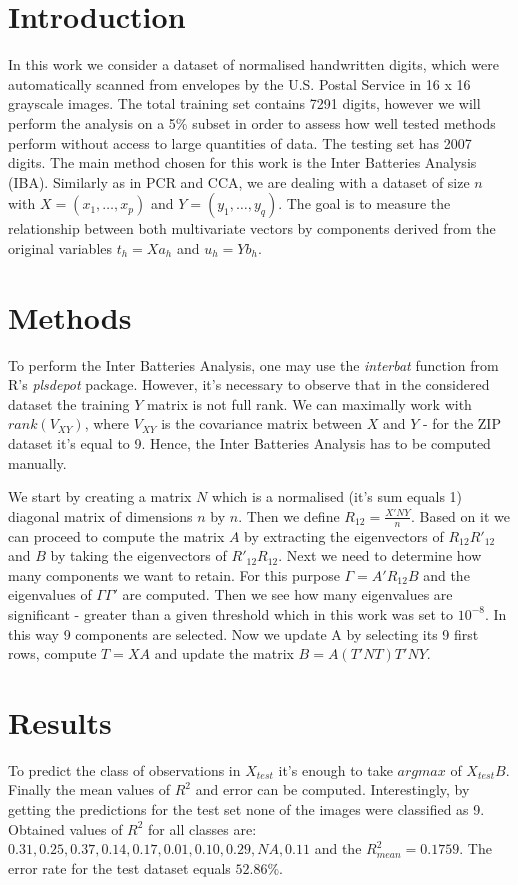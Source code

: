 \documentclass[a4,12pt]{article}
\begin{document}
    \section{Introduction}

    In this work we consider a dataset of normalised handwritten digits, which were automatically scanned from envelopes by the U.S. Postal Service in 16 x 16 grayscale images.
    The total training set contains 7291 digits, however we will perform the analysis on a 5\% subset in order to assess how well tested methods perform without access to large quantities of data.
    The testing set has 2007 digits.
    The main method chosen for this work is the Inter Batteries Analysis (IBA).
    Similarly as in PCR and CCA, we are dealing with a dataset of size $n$ with $X = (x_1, \ldots, x_p)$ and $Y = (y_1, \ldots, y_q)$.
    The goal is to measure the relationship between both multivariate vectors by components derived from the original variables $t_h = Xa_h$ and $u_h = Yb_h$.

    \section{Methods}

    To perform the Inter Batteries Analysis, one may use the \textit{interbat} function from R's \textit{plsdepot} package.
    However, it's necessary to observe that in the considered dataset the training $Y$ matrix is not full rank.
    We can maximally work with $rank(V_{XY})$, where $V_{XY}$ is the covariance matrix between $X$ and $Y$ - for the ZIP dataset it's equal to 9.
    Hence, the Inter Batteries Analysis has to be computed manually.

    \bigskip

    We start by creating a matrix $N$ which is a normalised (it's sum equals 1) diagonal matrix of dimensions $n$ by $n$.
    Then we define $R_{12} = \frac{X'NY}{n}$.
    Based on it we can proceed to compute the matrix $A$ by extracting the eigenvectors of $R_{12}R'_{12}$ and $B$ by taking the eigenvectors of $R'_{12}R_{12}$.
    Next we need to determine how many components we want to retain.
    For this purpose $\Gamma = A'R_{12}B$ and the eigenvalues of $\Gamma \Gamma'$ are computed.
    Then we see how many eigenvalues are significant - greater than a given threshold which in this work was set to $10^{-8}$.
    In this way 9 components are selected.
    Now we update A by selecting its 9 first rows, compute $T = XA$ and update the matrix $B = A(T'NT)T'NY$.

    \section{Results}
    To predict the class of observations in $X_{test}$ it's enough to take $argmax$ of $X_{test}B$.
    Finally the mean values of $R^2$ and error can be computed.
    Interestingly, by getting the predictions for the test set none of the images were classified as 9.
    Obtained values of $R^2$ for all classes are: $0.31, 0.25, 0.37, 0.14, 0.17, 0.01, 0.10, 0.29, NA, 0.11$ and the $R^2_{mean} = 0.1759$.
    The error rate for the test dataset equals $52.86\%$.
\end{document}
